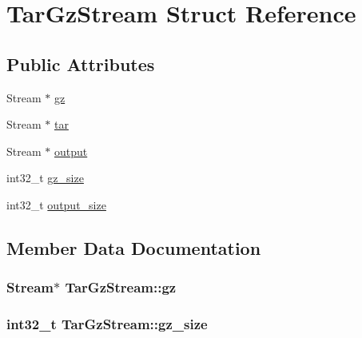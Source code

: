 \hypertarget{structTarGzStream}{}\section{Tar\+Gz\+Stream Struct Reference}
\label{structTarGzStream}
\subsection*{Public Attributes}
\begin{DoxyCompactItemize}
\item 
Stream $\ast$ \hyperlink{structTarGzStream_a95e37faf200dbe1957dd2969fbc3fe83}{gz}
\item 
Stream $\ast$ \hyperlink{structTarGzStream_a1379631773007f33db4bb41a01526359}{tar}
\item 
Stream $\ast$ \hyperlink{structTarGzStream_abccaf0e4972ceed18368d19df39d97b2}{output}
\item 
int32\+\_\+t \hyperlink{structTarGzStream_af25edc843b297bbf311e10c5c3a06a95}{gz\+\_\+size}
\item 
int32\+\_\+t \hyperlink{structTarGzStream_a38f582283166a6fc9424887aef3c25b8}{output\+\_\+size}
\end{DoxyCompactItemize}


\subsection{Member Data Documentation}
\subsubsection[{\texorpdfstring{gz}{gz}}]{\setlength{\rightskip}{0pt plus 5cm}Stream$\ast$ Tar\+Gz\+Stream\+::gz}\hypertarget{structTarGzStream_a95e37faf200dbe1957dd2969fbc3fe83}{}\label{structTarGzStream_a95e37faf200dbe1957dd2969fbc3fe83}
\subsubsection[{\texorpdfstring{gz\+\_\+size}{gz_size}}]{\setlength{\rightskip}{0pt plus 5cm}int32\+\_\+t Tar\+Gz\+Stream\+::gz\+\_\+size}\hypertarget{structTarGzStream_af25edc843b297bbf311e10c5c3a06a95}{}\label{structTarGzStream_af25edc843b297bbf311e10c5c3a06a95}
